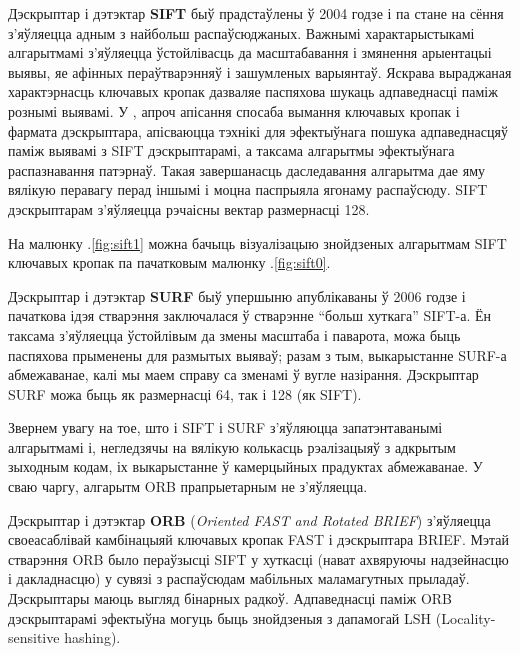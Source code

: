 \vspace{5mm}

Дэскрыптар і дэтэктар \textbf{SIFT} \cite{sift-paper} быў прадстаўлены ў 2004 годзе і
па стане на сёння з'яўляецца адным з найбольш распаўсюджаных.
Важнымі характарыстыкамі алгарытмамі з'яўляецца ўстойлівасць да масштабавання і
змянення арыентацыі выявы, яе афінных пераўтварэнняў
і зашумленых варыянтаў. Яскрава выраджаная характэрнасць ключавых кропак дазваляе
паспяхова шукаць адпаведнасці паміж
рознымі выявамі. У \cite{sift-paper}, апроч апісання спосаба вымання ключавых кропак
і фармата дэскрыптара, апісваюцца тэхнікі для
эфектыўнага пошука адпаведнасцяў паміж выявамі з SIFT дэскрыптарамі,
а таксама алгарытмы эфектыўнага распазнавання патэрнаў.
Такая завершанасць даследавання алгарытма дае яму вялікую перавагу перад
іншымі і моцна паспрыяла ягонаму распаўсюду.
SIFT дэскрыптарам з'яўляецца рэчаісны вектар размернасці 128.

На малюнку \cursection.\ref{fig:sift1} можна бачыць візуалізацыю знойдзеных
алгарытмам SIFT ключавых кропак па пачатковым малюнку \cursection.\ref{fig:sift0}.

Дэскрыптар і дэтэктар \textbf{SURF} \cite{surf-paper} быў упершыню апублікаваны ў 2006 годзе
і пачаткова ідэя стварэння заключалася ў стварэнне ``больш хуткага'' SIFT-а.
Ён таксама з'яўляецца ўстойлівым да змены масштаба і паварота, можа быць паспяхова прыменены
для размытых выяваў; разам з тым, выкарыстанне SURF-а абмежаванае,
калі мы маем справу са зменамі ў вугле назірання. Дэскрыптар SURF
можа быць як размернасці 64, так і 128 (як SIFT).

Звернем увагу на тое, што і SIFT і SURF з'яўляюцца запатэнтаванымі алгарытмамі і,
негледзячы на вялікую колькасць рэалізацыяў з адкрытым
зыходным кодам, іх выкарыстанне ў камерцыйных прадуктах абмежаванае.
У сваю чаргу, алгарытм ORB прапрыетарным не з'яўляецца.

\vspace{5mm}

Дэскрыптар і дэтэктар \textbf{ORB} (\textit{Oriented FAST and Rotated BRIEF}) \cite{orb-paper}
з'яўляецца своеасаблівай камбінацыяй ключавых кропак FAST і дэскрыптара BRIEF.
Мэтай стварэння ORB было пераўзысці SIFT у хуткасці (нават ахвяруючы надзейнасцю і дакладнасцю)
у сувязі з распаўсюдам мабільных маламагутных прыладаў. Дэскрыптары маюць выгляд бінарных радкоў.
Адпаведнасці паміж ORB дэскрыптарамі эфектыўна могуць быць знойдзеныя з дапамогай LSH (Locality-sensitive hashing).

\vspace{5mm}

